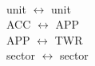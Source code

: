  \\
unit $\leftrightarrow$ unit \\
ACC $\leftrightarrow$ APP \\
APP $\leftrightarrow$ TWR \\
sector $\leftrightarrow$ sector







